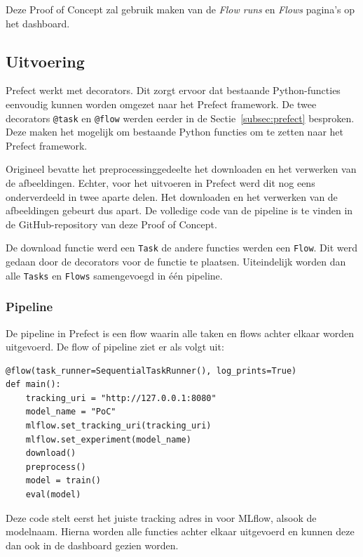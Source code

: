Deze Proof of Concept zal gebruik maken van de \textit{Flow runs} en \textit{Flows} pagina's op het dashboard.

\subsection{Uitvoering}

Prefect werkt met decorators. Dit zorgt ervoor dat bestaande Python-functies eenvoudig kunnen worden omgezet naar het Prefect framework. De twee decorators \texttt{@task} en \texttt{@flow} werden eerder in de Sectie~\ref{subsec:prefect} besproken. Deze maken het mogelijk om bestaande Python functies om te zetten naar het Prefect framework.

Origineel bevatte het preprocessinggedeelte het downloaden en het verwerken van de afbeeldingen. Echter, voor het uitvoeren in Prefect werd dit nog eens onderverdeeld in twee aparte delen. Het downloaden en het verwerken van de afbeeldingen gebeurt dus apart. De volledige code van de pipeline is te vinden in de GitHub-repository van deze Proof of Concept. %

De download functie werd een \texttt{Task} de andere functies werden een \texttt{Flow}. Dit werd gedaan door de decorators voor de functie te plaatsen. Uiteindelijk worden dan alle \texttt{Tasks} en \texttt{Flows} samengevoegd in één pipeline.

\subsubsection{Pipeline}

De pipeline in Prefect is een flow waarin alle taken en flows achter elkaar worden uitgevoerd. De flow of pipeline ziet er als volgt uit:

\begin{verbatim}
@flow(task_runner=SequentialTaskRunner(), log_prints=True)
def main():
    tracking_uri = "http://127.0.0.1:8080"
    model_name = "PoC"
    mlflow.set_tracking_uri(tracking_uri)
    mlflow.set_experiment(model_name)
    download()
    preprocess()
    model = train()
    eval(model)
\end{verbatim}

Deze code stelt eerst het juiste tracking adres in voor MLflow, alsook de modelnaam. Hierna worden alle functies achter elkaar uitgevoerd en kunnen deze dan ook in de dashboard gezien worden.

